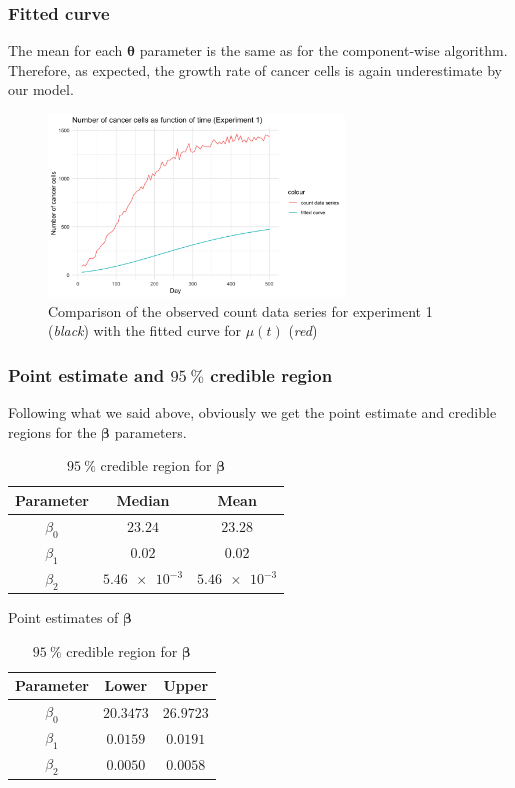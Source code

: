 \subsubsection*{Fitted curve}

The mean for each $\bm{\theta}$ parameter is the same as for the component-wise algorithm. Therefore, as expected, the growth rate of cancer cells is again underestimate by our model.

\begin{figure}[H]
	\centering
	\includegraphics[width=0.7\textwidth]{figures/metropolis_vw/metropolis_vw_fitted_curve.png}
	\caption{Comparison of the observed count data series for experiment 1 (\textit{black}) with the fitted curve for $\mu(t)$ (\textit{red})}
	\label{fig:metropolis-vw-fitted-curve}
\end{figure}

\subsubsection*{Point estimate and $\SI{95}{\percent}$ credible region}

Following what we said above, obviously we get the point estimate and credible regions for the $\bm{\beta}$ parameters.

\begin{table}[H]
	\parbox{0.45\linewidth}{
		\centering
		\begin{tabular}{|c|c|c|} \hline 
			Parameter & Median & Mean \\ \hline 
			$\beta_0$ & $23.24$ & $23.28$ \\ 
			$\beta_1$ & $0.02$ & $0.02$ \\
			$\beta_2$ & $\num{5.46e-3}$ & $\num{5.46e-3}$ \\ \hline
		\end{tabular}
		\caption{Point estimates of $\bm{\beta}$}
		\label{tab:metropolis-vw-point-estimates}
	}
	\hfill
	\parbox{0.45\linewidth}{
		\centering
		\begin{tabular}{|c|c|c|} \hline 
			Parameter & Lower & Upper \\ \hline 
			$\beta_0$ & $20.3473$ & $26.9723$ \\ 
			$\beta_1$ & $0.0159$ & $0.0191$ \\
			$\beta_2$ & $0.0050$ & $0.0058$ \\ \hline
		\end{tabular}
		\caption{$\SI{95}{\percent}$ credible region for $\bm{\beta}$}
		\label{tab:metropolis-vw-credible-region}
	}
\end{table}